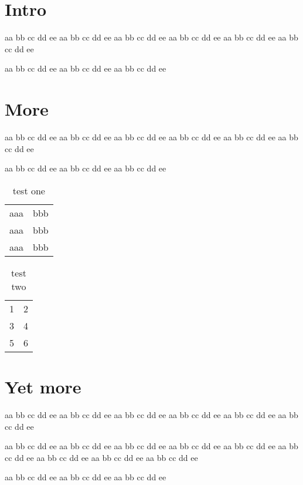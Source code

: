\documentclass{article}
\def\xa{aa bb cc dd ee }
\def\xb{\xa\xa\xa\xa\xa\xa\par\xa\xa\xa}
\begin{document}
\tableofcontents

\section{Intro}
\xb

\section{More}
\xb

\begin{table}
  \begin{tabular}{|ll|}
aaa&bbb\\
aaa&bbb\\
aaa&bbb\\
  \end{tabular}
  \caption{test one}
\end{table}
\begin{table}
  \begin{tabular}{|ll|}
1&2\\
3&4\\
5&6\\
  \end{tabular}
  \caption{test two}
\end{table}

\section{Yet more}
\xb\xb
\end{document}
